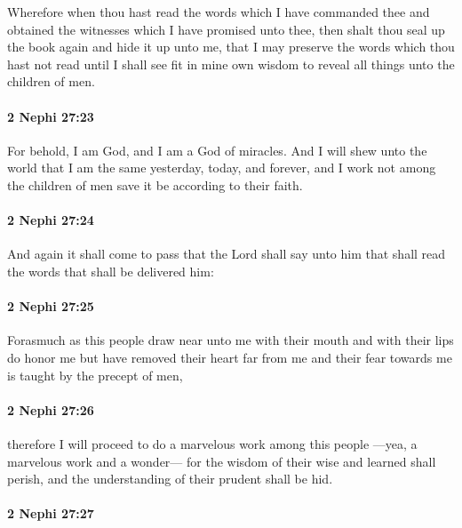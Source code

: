 			Wherefore when thou hast read the words which I have commanded thee
			and obtained the witnesses which I have promised unto thee,
			then shalt thou seal up the book again and hide it up unto me,
			that I may preserve the words which thou hast not read
			until I shall see fit in mine own wisdom
			to reveal all things unto the children of men.

		\paragraph{2 Nephi 27:23} %
			\label{2NEPHI-27-23}

			For behold, I am God, and I am a God of miracles.
			And I will shew unto the world
			that I am the same yesterday, today, and forever,
			and I work not among the children of men save it be according to their faith.

		\paragraph{2 Nephi 27:24} %
			\label{2NEPHI-27-24}

			And again it shall come to pass that the Lord shall say unto him
			that shall read the words that shall be delivered him:

		\paragraph{2 Nephi 27:25} %
			\label{2NEPHI-27-25}

			Forasmuch as this people draw near unto me with their mouth
			and with their lips do honor me
			but have removed their heart far from me
			and their fear towards me is taught by the precept of men,

		\paragraph{2 Nephi 27:26} %
			\label{2NEPHI-27-26}

			therefore I will proceed to do a marvelous work among this people
			---yea, a marvelous work and a wonder---
			for the wisdom of their wise and learned shall perish,
			and the understanding of their prudent shall be hid.

		\paragraph{2 Nephi 27:27} %
			\label{2NEPHI-27-27}

